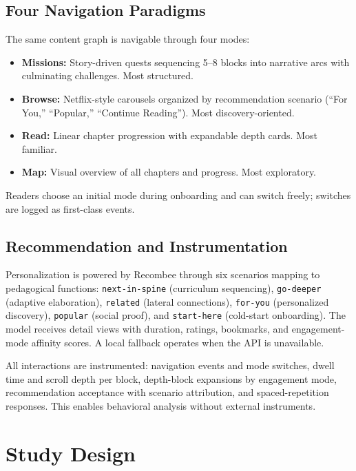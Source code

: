 \documentclass[sigconf]{acmart}
\begin{document}
\subsection{Four Navigation Paradigms}

The same content graph is navigable through four modes:
\begin{itemize}
  \item \textbf{Missions:} Story-driven quests sequencing 5--8 blocks into narrative arcs with culminating challenges. Most structured.
  \item \textbf{Browse:} Netflix-style carousels organized by recommendation scenario (``For You,'' ``Popular,'' ``Continue Reading''). Most discovery-oriented.
  \item \textbf{Read:} Linear chapter progression with expandable depth cards. Most familiar.
  \item \textbf{Map:} Visual overview of all chapters and progress. Most exploratory.
\end{itemize}
Readers choose an initial mode during onboarding and can switch freely; switches are logged as first-class events.

\subsection{Recommendation and Instrumentation}

Personalization is powered by Recombee through six scenarios mapping to pedagogical functions: \texttt{next-in-spine} (curriculum sequencing), \texttt{go-deeper} (adaptive elaboration), \texttt{related} (lateral connections), \texttt{for-you} (personalized discovery), \texttt{popular} (social proof), and \texttt{start-here} (cold-start onboarding). The model receives detail views with duration, ratings, bookmarks, and engagement-mode affinity scores. A local fallback operates when the API is unavailable.

All interactions are instrumented: navigation events and mode switches, dwell time and scroll depth per block, depth-block expansions by engagement mode, recommendation acceptance with scenario attribution, and spaced-repetition responses. This enables behavioral analysis without external instruments.

\section{Study Design}
\end{document}
